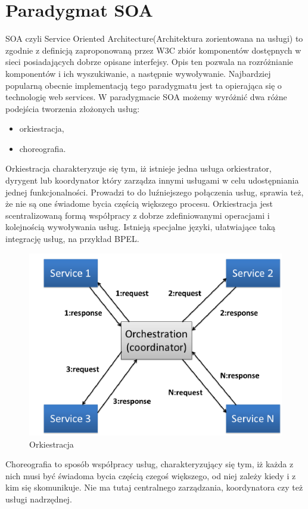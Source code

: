 \section{Paradygmat SOA}
SOA czyli Service Oriented Architecture(Architektura zorientowana na usługi) to zgodnie z definicją zaproponowaną przez W3C zbiór komponentów dostępnych w sieci posiadających dobrze opisane interfejsy. Opis ten pozwala na rozróżnianie komponentów i ich wyszukiwanie, a następnie wywoływanie. Najbardziej popularną obecnie implementacją tego paradygmatu jest ta opierająca się o technologię web services.  W paradygmacie SOA możemy wyróżnić dwa różne podejścia tworzenia złożonych usług:
 \begin{itemize}
	\item orkiestracja,
	\item choreografia.
\end{itemize}  
Orkiestracja charakteryzuje się tym, iż istnieje jedna usługa orkiestrator, dyrygent lub koordynator który zarządza innymi usługami w celu udostępniania jednej funkcjonalności. Prowadzi to do luźniejszego połączenia usług, sprawia też, że nie są one świadome bycia częścią większego procesu. Orkiestracja jest scentralizowaną formą współpracy z dobrze zdefiniowanymi operacjami i kolejnością wywoływania usług. Istnieją specjalne języki, ułatwiające taką integrację usług, na przykład BPEL.
\begin{figure}[!h]
	\centering
	\includegraphics[scale=0.75]{orkiestracja.png} 
	\caption{Orkiestracja}
\end{figure}
\newpage
Choreografia to sposób współpracy usług, charakteryzujący się tym,  iż każda z nich musi być świadoma bycia częścią czegoś większego, od niej zależy kiedy i z kim się skomunikuje. Nie ma tutaj centralnego zarządzania, koordynatora czy też usługi nadrzędnej. 

